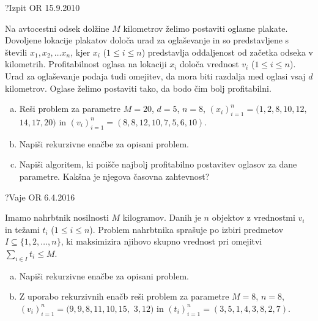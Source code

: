 
\begin{naloga}{?}{Izpit OR 15.9.2010}
\begin{vprasanje}
Na avtocestni odsek dolžine $M$ kilometrov
želimo postaviti oglasne plakate.
Dovoljene lokacije plakatov določa urad za oglaševanje
in so predstavljene s števili $x_1, x_2, \dots x_n$,
kjer $x_i$ ($1 \le i \le n$)
predstavlja oddaljenost od začetka odseka v kilometrih.
Profitabilnost oglasa na lokaciji $x_i$ določa vrednost $v_i$
($1 \le i \le n$).
Urad za oglaševanje podaja tudi omejitev,
da mora biti razdalja med oglasi vsaj $d$ kilometrov.
Oglase želimo postaviti tako, da bodo čim bolj profitabilni.
\begin{enumerate}[(a)]
\item Reši problem za parametre $M = 20$, $d = 5$, $n = 8$,
$(x_i)_{i=1}^n = (1, 2, 8, 10, 12,$ $14, 17, 20)$ in
$(v_i)_{i=1}^n = (8, 8, 12, 10, 7, 5, 6, 10)$.
\item Napiši rekurzivne enačbe za opisani problem.
\item Napiši algoritem,
ki poišče najbolj profitabilno postavitev oglasov za dane parametre.
Kakšna je njegova časovna zahtevnost?
\end{enumerate}

\end{vprasanje}
\begin{odgovor}
\end{odgovor}
\end{naloga}


\begin{naloga}{?}{Vaje OR 6.4.2016}
\begin{vprasanje}
Imamo nahrbtnik nosilnosti $M$ kilogramov.
Danih je $n$ objektov z vrednostmi $v_i$ in težami $t_i$ ($1 \le i \le n$).
Problem nahrbtnika sprašuje po izbiri predmetov
$I \subseteq \{1, 2, \dots, n\}$,
ki maksimizira njihovo skupno vrednost pri omejitvi $\sum_{i \in I} t_i \le M$.
\begin{enumerate}[(a)]
\item Napiši rekurzivne enačbe za opisani problem.
\item Z uporabo rekurzivnih enačb reši problem za parametre $M = 8$, $n = 8$,
$(v_i)_{i=1}^n = (9, 9, 8, 11, 10, 15,$ $3, 12)$ in
$(t_i)_{i=1}^n = (3, 5, 1, 4, 3, 8, 2, 7)$.
\end{enumerate}

\end{vprasanje}
\begin{odgovor}
\end{odgovor}
\end{naloga}


